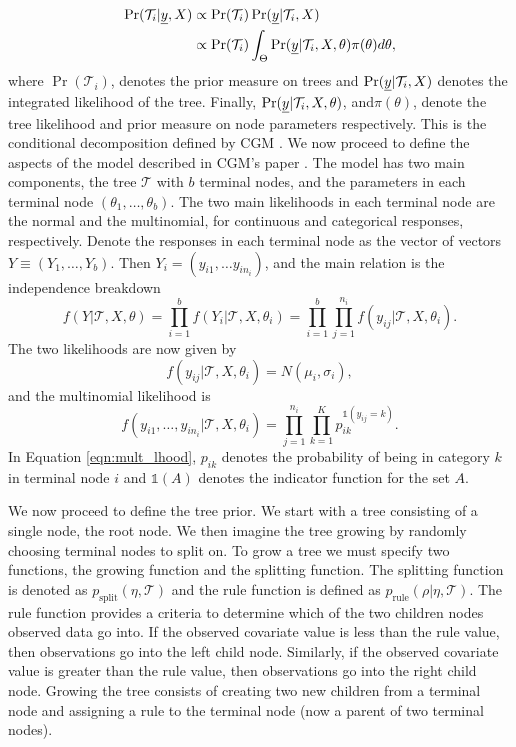 \begin{align}
 \Pr(\mathcal{T}_i \vert \underline{y}, X ) &\propto \Pr(\mathcal{T}_i)\Pr(\underline{y} \vert \mathcal{T}_i, X)\\
  &\propto \Pr(\mathcal{T}_i)\int_{\Theta}\Pr(\underline{y} \vert \mathcal{T}_i, X, \theta)\pi(\theta)d\theta,
\end{align}
where $\Pr(\mathcal{T}_i)$, denotes the prior measure on trees and $\Pr(\underline{y} \vert \mathcal{T}_i, X)$ denotes the integrated likelihood of the tree. Finally, $\Pr(\underline{y} \vert \mathcal{T}_i, X, \theta)$, and$\pi(\theta)$, denote the tree likelihood and prior measure on node parameters respectively. This is the conditional decomposition defined by CGM \cite{chipman1998bayesian}. We now proceed to define the aspects of the model described in CGM's paper \cite{chipman1998bayesian}. 
The model has two main components, the tree $\mathcal{T}$ with $b$ terminal nodes, and the parameters in each terminal node $(\theta_1,\dots,\theta_b)$. 
The two main likelihoods in each terminal node are the normal and the multinomial, for continuous and categorical responses, respectively. 
Denote the responses in each terminal node as the vector  of vectors $Y\equiv (Y_1, \dots, Y_b)$. Then $Y_i = (y_{i1}, \dots y_{in_i})$, and the main relation is the independence breakdown 
\begin{equation}
f(Y\vert \mathcal{T}, X, \theta) =\prod_{i=1}^b f(Y_i\vert \mathcal{T}, X, \theta_i) = \prod_{i=1}^b \prod_{j=1}^{n_i} f(y_{ij} \vert \mathcal{T}, X, \theta_i).
\end{equation}
The two likelihoods are now given by
\begin{equation}
f(y_{ij} \vert \mathcal{T}, X, \theta_i) = N(\mu_i,\sigma_i),
\end{equation}
and the multinomial likelihood is
\begin{equation}\label{eqn:mult_lhood}
f(y_{i1}, \dots ,y_{in_i} \vert \mathcal{T}, X, \theta_i) = \prod_{j=1}^{n_i}\prod_{k=1}^K p_{ik}^{\mathds{1}(y_{ij}=k)}.
\end{equation}
In Equation \ref{eqn:mult_lhood}, $p_{ik}$ denotes the probability of being in category $k$ in terminal node $i$ and $\mathds{1}(A)$ denotes the indicator function for the set $A$. 

We now proceed to define the tree prior. We start with a tree consisting of a single node, the root node. We then imagine the tree growing by randomly choosing terminal nodes to split on. To grow a tree we must specify two functions, the growing function and the splitting function.  The splitting function is denoted as $p_{\text{split}}(\eta, \mathcal{T})$ and the rule function is defined as $p_{\text{rule}}(\rho \vert \eta, \mathcal{T})$. The rule function provides a criteria to determine which of the two children nodes observed data go into. If the observed covariate value is less than the rule value, then observations go into the left child node. Similarly, if the observed covariate value is greater than the rule value, then observations go into the right child node. Growing the tree consists of creating two new children from a terminal node and assigning a rule to the terminal node (now a parent of two terminal nodes). 


